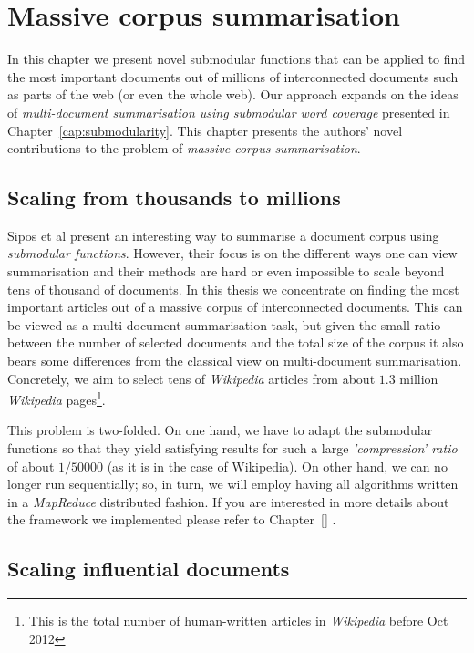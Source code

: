 \chapter{Massive corpus summarisation}

In this chapter we present novel submodular functions that can be applied to
find the most important documents out of millions of interconnected documents
such as parts of the web (or even the whole web).
Our approach expands on the ideas of \emph{multi-document summarisation using
submodular word coverage} \cite{sipos2012temporal} presented in
Chapter~\vref{cap:submodularity}.
This chapter presents the authors' novel contributions to the problem of
\emph{massive corpus summarisation}.

\section{Scaling from thousands to millions}

Sipos et al \cite{sipos2012temporal} present an interesting way to summarise a
document corpus using \emph{submodular functions}. However, their focus is on
the different ways one can view summarisation and their methods are hard or
even impossible to scale beyond tens of thousand of documents.
In this thesis we concentrate on finding the most important articles out of a
massive corpus of interconnected documents. This can be viewed as a
multi-document summarisation task, but given the small ratio between the
number of selected documents and the total size of the corpus it also bears
some differences from the classical view on multi-document summarisation.
Concretely, we aim to select tens of \emph{Wikipedia} articles from about
\(1.3\) million \emph{Wikipedia} pages\footnote{This is the total number of
human-written articles in \emph{Wikipedia} before Oct 2012}.

This problem is two-folded. On one hand, we have to adapt the submodular
functions so that they yield satisfying results for such a large
\emph{'compression' ratio} of about \(1/50000\) (as it is in the case of
Wikipedia). On other hand, we can no longer run sequentially; so, in turn, we
will employ having all algorithms written in a \emph{MapReduce}
\cite{dean2008mapreduce} distributed fashion. If you are interested in more
details about the framework we implemented please refer to Chapter~\vref{}
.

\section{Scaling influential documents}
\label{sec:scale-doc-influence}


